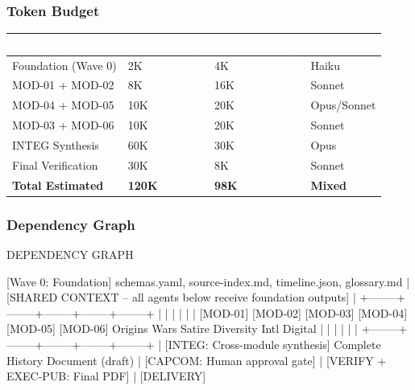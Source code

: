 \documentclass[11pt,letterpaper]{article}
\newcommand{\tableheader}[1]{\textbf{\sffamily\textcolor{white}{#1}}}
\begin{document}
\subsubsection{Token Budget}

\begin{center}
\begin{tabularx}{\textwidth}{L{3.5cm}C{2cm}C{2cm}C{2cm}}
\toprule
{}
\tableheader{Component} & \tableheader{Input Tokens} & \tableheader{Output Tokens} & \tableheader{Model} \\
\midrule
Foundation (Wave 0) & 2K & 4K & Haiku \\
MOD-01 + MOD-02 & 8K & 16K & Sonnet \\
MOD-04 + MOD-05 & 10K & 20K & Opus/Sonnet \\
MOD-03 + MOD-06 & 10K & 20K & Sonnet \\
INTEG Synthesis & 60K & 30K & Opus \\
Final Verification & 30K & 8K & Sonnet \\
\midrule
\textbf{Total Estimated} & \textbf{120K} & \textbf{98K} & \textbf{Mixed} \\
\bottomrule
\end{tabularx}
\end{center}

\subsubsection{Dependency Graph}

\begin{asciibox}
DEPENDENCY GRAPH

[Wave 0: Foundation]
  schemas.yaml, source-index.md, timeline.json, glossary.md
        |
   [SHARED CONTEXT -- all agents below receive foundation outputs]
        |
        +--------+--------+--------+--------+--------+
        |        |        |        |        |        |
    [MOD-01] [MOD-02] [MOD-03] [MOD-04] [MOD-05] [MOD-06]
    Origins   Wars    Satire  Diversity Intl   Digital
        |        |        |        |        |        |
        +--------+--------+--------+--------+--------+
                              |
                    [INTEG: Cross-module synthesis]
                    Complete History Document (draft)
                              |
                    [CAPCOM: Human approval gate]
                              |
                    [VERIFY + EXEC-PUB: Final PDF]
                              |
                         [DELIVERY]
\end{asciibox}
\end{document}
